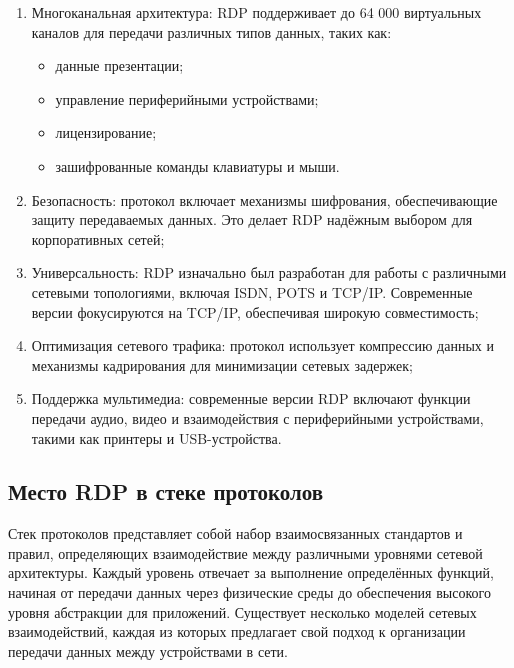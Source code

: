 \documentclass[bachelor, och, coursework]{SCWorks}
\begin{document}
\begin{enumerate}
  \item Многоканальная архитектура: RDP поддерживает до 64 000 виртуальных каналов для передачи различных типов данных, таких как:
  
  \begin{itemize}
    \item данные презентации;
    \item управление периферийными устройствами;
    \item лицензирование;
    \item зашифрованные команды клавиатуры и мыши.
    
  \end{itemize}
  
  \item Безопасность: протокол включает механизмы шифрования, обеспечивающие защиту передаваемых данных. Это делает RDP надёжным выбором для корпоративных сетей;
  
  \item Универсальность: RDP изначально был разработан для работы с различными сетевыми топологиями, включая ISDN, POTS и TCP/IP. Современные версии фокусируются на TCP/IP, обеспечивая широкую совместимость;
  
  \item Оптимизация сетевого трафика: протокол использует компрессию данных и механизмы кадрирования для минимизации сетевых задержек;
  
  \item Поддержка мультимедиа: современные версии RDP включают функции передачи аудио, видео и взаимодействия с периферийными устройствами, такими как принтеры и USB-устройства.
\end{enumerate}


\subsection{Место RDP в стеке протоколов}

Стек протоколов представляет собой набор взаимосвязанных стандартов и правил, определяющих взаимодействие между различными уровнями сетевой 
архитектуры. Каждый уровень отвечает за выполнение определённых функций, начиная от передачи данных через физические среды до обеспечения 
высокого уровня абстракции для приложений. Существует несколько моделей сетевых взаимодействий, каждая из которых предлагает свой подход 
к организации передачи данных между устройствами в сети.
\end{document}
